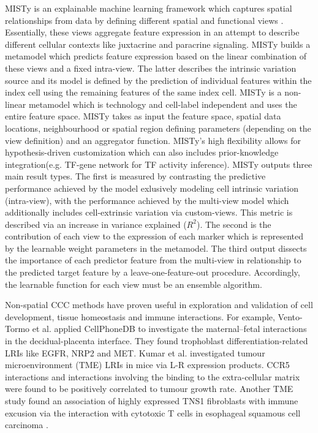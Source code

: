 MISTy is an explainable machine learning framework which captures spatial relationships from data by defining different spatial and functional views \cite{Tanevski-2022}. Essentially, these views aggregate feature expression in an attempt to describe different cellular contexts like juxtacrine and paracrine signaling. MISTy builds a metamodel which predicts feature expression based on the linear combination of these views and a fixed intra-view. The latter describes the intrinsic variation source and its model is defined by the prediction of individual features within the index cell using the remaining features of the same index cell. MISTy is a non-linear metamodel which is technology and cell-label independent and uses the entire feature space. MISTy takes as input the feature space, spatial data locations, neighbourhood or spatial region defining parameters (depending on the view definition) and an aggregator function. MISTy's high flexibility allows for hypothesis-driven customization which can also includes prior-knowledge integration(e.g. TF-gene network for TF activity inference). MISTy outputs three main result types. The first is measured by contrasting the predictive performance achieved by the model exlusively modeling cell intrinsic variation (intra-view), with the performance achieved by the multi-view model which additionally includes cell-extrinsic variation via custom-views. This metric is described via an increase in variance explained ($R^2$). The second is the contribution of each view to the expression of each marker which is represented by the learnable weight parameters in the metamodel. The third output dissects the importance of each predictor feature from the multi-view in relationship to the predicted target feature by a leave-one-feature-out procedure. Accordingly, the learnable function for each view must be an ensemble algorithm.

Non-spatial CCC methods have proven useful in exploration and validation of cell development, tissue homeostasis and immune interactions. For example, Vento-Tormo et al. applied CellPhoneDB to investigate the maternal–fetal interactions in the decidual-placenta interface. They found trophoblast differentiation-related LRIs like EGFR, NRP2 and MET. Kumar et al. investigated tumour microenvironment (TME) LRIs in mice via L-R expression products. CCR5 interactions and interactions involving the binding to the extra-cellular matrix were found to be positively correlated to tumour growth rate. Another TME study found an association of highly expressed TNS1 fibroblasts with immune excusion via the interaction with cytotoxic T cells in esophageal squamous cell carcinoma \cite{Li-2021}.

